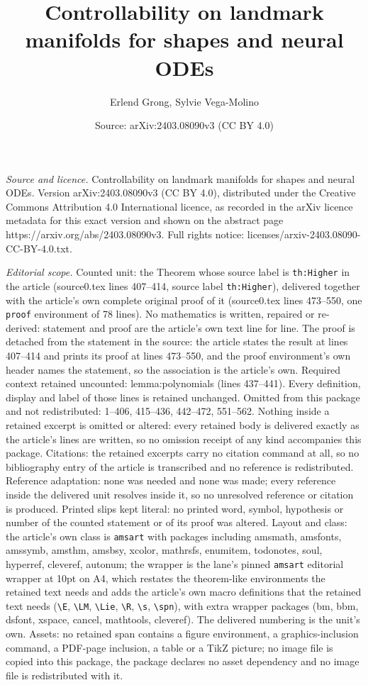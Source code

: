 \documentclass[10pt,a4paper]{amsart}
\title[Controllability on landmark manifolds for shapes and neural ]{Controllability on landmark manifolds for shapes and neural ODEs}
\author{Erlend Grong, Sylvie Vega-Molino}
\date{Source: arXiv:2403.08090v3 (CC BY 4.0)}
\begin{document}
\maketitle

\noindent\emph{Source and licence.} Controllability on landmark manifolds for shapes and neural ODEs. Version arXiv:2403.08090v3 (CC BY 4.0), distributed under the Creative Commons Attribution 4.0 International licence, as recorded in the arXiv licence metadata for this exact version and shown on the abstract page https://arxiv.org/abs/2403.08090v3. Full rights notice: licenses/arxiv-2403.08090-CC-BY-4.0.txt.\par\smallskip

\noindent\textit{Editorial scope.} Counted unit: the Theorem whose source label is \texttt{th:Higher} in the article (source0.tex lines 407--414, source label \texttt{th:Higher}), delivered together with the article's own complete original proof of it (source0.tex lines 473--550, one \texttt{proof} environment of 78 lines). No mathematics is written, repaired or re-derived: statement and proof are the article's own text line for line. The proof is detached from the statement in the source: the article states the result at lines 407--414 and prints its proof at lines 473--550, and the proof environment's own header names the statement, so the association is the article's own. Required context retained uncounted: lemma:polynomials (lines 437--441). Every definition, display and label of those lines is retained unchanged. Omitted from this package and not redistributed: 1--406, 415--436, 442--472, 551--562. Nothing inside a retained excerpt is omitted or altered: every retained body is delivered exactly as the article's lines are written, so no omission receipt of any kind accompanies this package. Citations: the retained excerpts carry no citation command at all, so no bibliography entry of the article is transcribed and no reference is redistributed. Reference adaptation: none was needed and none was made; every reference inside the delivered unit resolves inside it, so no unresolved reference or citation is produced. Printed slips kept literal: no printed word, symbol, hypothesis or number of the counted statement or of its proof was altered. Layout and class: the article's own class is \texttt{amsart} with packages including amsmath, amsfonts, amssymb, amsthm, amsbsy, xcolor, mathrsfs, enumitem, todonotes, soul, hyperref, cleveref, autonum; the wrapper is the lane's pinned \texttt{amsart} editorial wrapper at 10pt on A4, which restates the theorem-like environments the retained text needs and adds the article's own macro definitions that the retained text needs (\texttt{\textbackslash E}, \texttt{\textbackslash LM}, \texttt{\textbackslash Lie}, \texttt{\textbackslash R}, \texttt{\textbackslash s}, \texttt{\textbackslash spn}), with extra wrapper packages (bm, bbm, dsfont, xspace, cancel, mathtools, cleveref). The delivered numbering is the unit's own. Assets: no retained span contains a figure environment, a graphics-inclusion command, a PDF-page inclusion, a table or a TikZ picture; no image file is copied into this package, the package declares no asset dependency and no image file is redistributed with it. 
\end{document}
